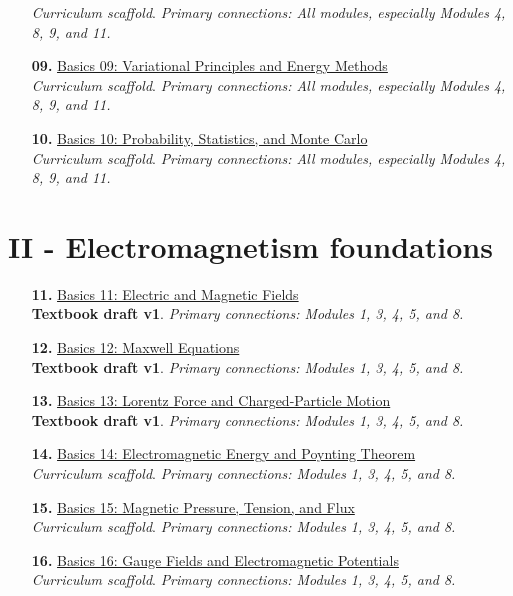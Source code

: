 \documentclass[11pt]{article}
\begin{document}
\begin{enumerate}[leftmargin=2.4em]
\textit{Curriculum scaffold}. \textit{Primary connections: All modules, especially Modules 4, 8, 9, and 11.}
\item[\textbf{09.}] \href{run:basics_09_variational_principles_and_energy_methods.pdf}{Basics 09: Variational Principles and Energy Methods}\\[-0.2em]
\textit{Curriculum scaffold}. \textit{Primary connections: All modules, especially Modules 4, 8, 9, and 11.}
\item[\textbf{10.}] \href{run:basics_10_probability_statistics_and_monte_carlo.pdf}{Basics 10: Probability, Statistics, and Monte Carlo}\\[-0.2em]
\textit{Curriculum scaffold}. \textit{Primary connections: All modules, especially Modules 4, 8, 9, and 11.}
\end{enumerate}

\section{II - Electromagnetism foundations}
\begin{enumerate}[leftmargin=2.4em]
\item[\textbf{11.}] \href{run:basics_11_electric_and_magnetic_fields.pdf}{Basics 11: Electric and Magnetic Fields}\\[-0.2em]
\textbf{Textbook draft v1}. \textit{Primary connections: Modules 1, 3, 4, 5, and 8.}
\item[\textbf{12.}] \href{run:basics_12_maxwell_equations.pdf}{Basics 12: Maxwell Equations}\\[-0.2em]
\textbf{Textbook draft v1}. \textit{Primary connections: Modules 1, 3, 4, 5, and 8.}
\item[\textbf{13.}] \href{run:basics_13_lorentz_force_and_charged_particle_motion.pdf}{Basics 13: Lorentz Force and Charged-Particle Motion}\\[-0.2em]
\textbf{Textbook draft v1}. \textit{Primary connections: Modules 1, 3, 4, 5, and 8.}
\item[\textbf{14.}] \href{run:basics_14_electromagnetic_energy_and_poynting_theorem.pdf}{Basics 14: Electromagnetic Energy and Poynting Theorem}\\[-0.2em]
\textit{Curriculum scaffold}. \textit{Primary connections: Modules 1, 3, 4, 5, and 8.}
\item[\textbf{15.}] \href{run:basics_15_magnetic_pressure_tension_and_flux.pdf}{Basics 15: Magnetic Pressure, Tension, and Flux}\\[-0.2em]
\textit{Curriculum scaffold}. \textit{Primary connections: Modules 1, 3, 4, 5, and 8.}
\item[\textbf{16.}] \href{run:basics_16_gauge_fields_and_electromagnetic_potentials.pdf}{Basics 16: Gauge Fields and Electromagnetic Potentials}\\[-0.2em]
\textit{Curriculum scaffold}. \textit{Primary connections: Modules 1, 3, 4, 5, and 8.}
\end{enumerate}
\end{document}

